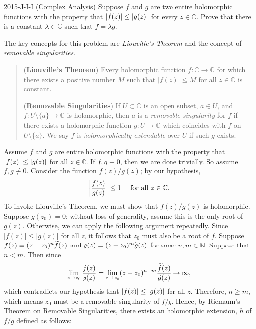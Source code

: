 \documentclass{article}
\begin{document}
\begin{prb}{2015-J-I-I (Complex Analysis)}
	Suppose $f$ and $g$ are two entire holomorphic functions with the property that $\left| f(z) \right| \leq \left| g(z) \right|$ for every $z \in \mathbb{C}$. Prove that there is a constant $\lambda \in \mathbb{C}$ such that $f = \lambda g$. 
\end{prb}
\begin{solutions}
	The key concepts for this problem are \textit{Liouville's Theorem} and the concept of \textit{removable singularities}. 
		\begin{quote}
			(\textbf{Liouville's Theorem}) Every holomorphic function $f: \mathbb{C} \to \mathbb{C}$ for which there exists a positive number $M$ such that $|f(z)| \leq M$ for all $z \in \mathbb{C}$ is constant. 
			
			(\textbf{Removable Singularities}) If $U \subset \mathbb{C}$ is an open subset, $a \in U$, and $f: U \setminus \{a\} \to \mathbb{C}$ is holomorphic, then $a$ is a \textit{removable singularity} for $f$ if there exists a holomorphic function $g: U \to \mathbb{C}$ which coincides with $f$ on $U\setminus \{a\}$. We say $f$ is \textit{holomorphically extendable} over $U$ if such $g$ exists. 
		\end{quote}
	Assume $f$ and $g$ are entire holomorphic functions with the property that $\left| f(z) \right| \leq \left| g(z) \right|$ for all $z \in \mathbb{C}$. If $f, g \equiv 0$, then we are done trivially. So assume $f, g \nequiv 0$. Consider the function $f(z)/g(z)$; by our hypothesis, 
		\begin{equation}
			\left| \frac{f(z)}{g(z)} \right| \leq 1 \quad \text{ for all $z \in \mathbb{C}$}. 
		\end{equation}
	To invoke Liouville's Theorem, we must show that $f(z)/g(z)$ is holomorphic. Suppose $g(z_{0}) = 0$; without loss of generality, assume this is the only root of $g(z)$. Otherwise, we can apply the following argument repeatedly. Since $|f(z)| \leq |g(z)|$ for all $z$, it follows that $z_{0}$ must also be a root of $f$. Suppose $f(z) = (z - z_{0})^{n}\widetilde{f}(z)$ and $g(z) = (z - z_{0})^{m}\widetilde{g}(z)$ for some $n, m \in \mathbb{N}$. Suppose that $n < m$. Then since 
		\begin{equation}
			\lim_{z \to z_{0}}\frac{f(z)}{g(z)} = \lim_{z \to z_{0}}(z - z_{0})^{n - m} \frac{\widetilde{f}(z)}{\widetilde{g}(z)} \to \infty, 
		\end{equation}
	which contradicts our hypothesis that $\left| f(z) \right| \leq \left| g(z) \right|$ for all $z$. Therefore, $n \geq m$, which means $z_{0}$ must be a removable singularity of $f/g$. Hence, by Riemann's Theorem on Removable Singularities, there exists an holomorphic extension, $h$ of $f/g$ defined as follows: 

\end{solutions}
\end{document}
